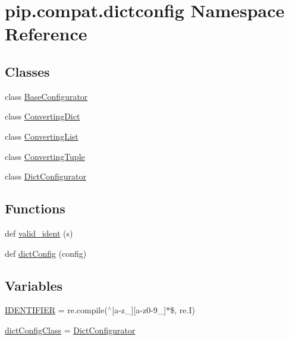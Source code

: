\hypertarget{namespacepip_1_1compat_1_1dictconfig}{}\section{pip.\+compat.\+dictconfig Namespace Reference}
\label{namespacepip_1_1compat_1_1dictconfig}
\subsection*{Classes}
\begin{DoxyCompactItemize}
\item 
class \hyperlink{classpip_1_1compat_1_1dictconfig_1_1_base_configurator}{Base\+Configurator}
\item 
class \hyperlink{classpip_1_1compat_1_1dictconfig_1_1_converting_dict}{Converting\+Dict}
\item 
class \hyperlink{classpip_1_1compat_1_1dictconfig_1_1_converting_list}{Converting\+List}
\item 
class \hyperlink{classpip_1_1compat_1_1dictconfig_1_1_converting_tuple}{Converting\+Tuple}
\item 
class \hyperlink{classpip_1_1compat_1_1dictconfig_1_1_dict_configurator}{Dict\+Configurator}
\end{DoxyCompactItemize}
\subsection*{Functions}
\begin{DoxyCompactItemize}
\item 
def \hyperlink{namespacepip_1_1compat_1_1dictconfig_ae726dd479aff71ed05b6c349a5d1afd8}{valid\+\_\+ident} (s)
\item 
def \hyperlink{namespacepip_1_1compat_1_1dictconfig_a7c7dbf3b8c6ea96a858743360cb7d2b2}{dict\+Config} (config)
\end{DoxyCompactItemize}
\subsection*{Variables}
\begin{DoxyCompactItemize}
\item 
\hyperlink{namespacepip_1_1compat_1_1dictconfig_a62131f0da612d375b64aa1fc74538872}{I\+D\+E\+N\+T\+I\+F\+I\+ER} = re.\+compile(\textquotesingle{}$^\wedge$\mbox{[}a-\/z\+\_\+\mbox{]}\mbox{[}a-\/z0-\/9\+\_\+\mbox{]}$\ast$\$\textquotesingle{}, re.\+I)
\item 
\hyperlink{namespacepip_1_1compat_1_1dictconfig_a9dd54bcb7bc10e7039f5dee70a955976}{dict\+Config\+Class} = \hyperlink{classpip_1_1compat_1_1dictconfig_1_1_dict_configurator}{Dict\+Configurator}
\end{DoxyCompactItemize}


